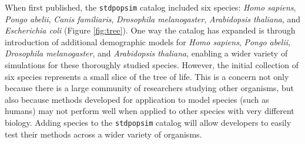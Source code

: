 \documentclass[hidelinks]{article}
\newcommand{\stdpopsim}{\texttt{stdpopsim}\xspace}
\begin{document}
When first published, the \stdpopsim catalog included six species:
\emph{Homo sapiens}, \emph{Pongo abelii}, \emph{Canis familiaris}, \emph{Drosophila melanogaster},
\emph{Arabidopsis thaliana}, and \emph{Escherichia coli} (Figure \ref{fig:tree}).
One way the catalog has expanded is through introduction of additional demographic models
for \emph{Homo sapiens}, \emph{Pongo abelii}, \emph{Drosophila melanogaster},
and \emph{Arabidopsis thaliana}, enabling a wider variety of simulations for these
thoroughly studied species.
However, the initial collection of six species represents a small slice of the tree of life.
This is a concern
not only because there is a large community of researchers studying other organisms,
but also because methods developed for application to model species (such as humans)
may not perform well when applied to other species with very different biology.
Adding species to the \stdpopsim catalog will allow developers to easily test their methods across a wider variety of organisms.
\end{document}
